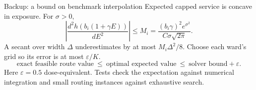\begin{frame}{Backup: a bound on benchmark interpolation}
  \small
  Expected capped service is concave in exposure. For $\sigma>0$,
  \[
    \left|\frac{d^2h(b_i(1+\gamma E))}{dE^2}\right|
       \le M_i=\frac{(b_i\gamma)^2e^{\sigma^2}}{C\sigma\sqrt{2\pi}}.
  \]
  A secant over width $\Delta$ underestimates by at most $M_i\Delta^2/8$.
  Choose each ward's grid so its error is at most $\varepsilon/K$.
  \[
    \text{exact feasible route value}\ \le\ \text{optimal expected value}
      \ \le\ \text{solver bound}+\varepsilon.
  \]
  Here $\varepsilon=0.5$ dose-equivalent. Tests check the expectation against numerical integration and small routing instances against exhaustive search.
\end{frame}
